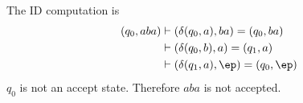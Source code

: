   The ID computation is
  \begin{align*}
    (q_0, aba)
    &\vdash (\delta(q_0, a), ba) = (q_0, ba) \\ 
    &\vdash (\delta(q_0, b), a) = (q_1, a) \\
    &\vdash (\delta(q_1, a), \ep) = (q_0, \ep)
  \end{align*}
  $q_0$ is not an accept state. Therefore $aba$ is not accepted.
